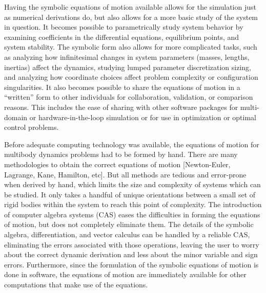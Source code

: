 \documentclass[twocolumn,10pt]{asme2e}
\begin{document}
Having the symbolic equations of motion available allows for the simulation
just as numerical derivations do, but also allows for a more basic study of the
system in question. It becomes possible to parametrically study system behavior
by examining coefficients in the differential equations, equilibrium points,
and system stability. The symbolic form also allows for more complicated tasks,
such as analyzing how infinitesimal changes in system parameters (masses,
lengths, inertias) affect the dynamics, studying lumped parameter
discretization sizing, and analyzing how coordinate choices affect problem
complexity or configuration singularities. It also becomes possible to share
the equations of motion in a “written” form to other individuals for
collaboration, validation, or comparison reasons. This includes the ease of
sharing with other software packages for multi-domain or hardware-in-the-loop
simulation or for use in optimization or optimal control problems.

Before adequate computing technology was available, the equations of motion for
multibody dynamics problems had to be formed by hand. There are many
methodologies to obtain the correct equations of motion [Newton-Euler,
Lagrange, Kane, Hamilton, etc]. But all methods are tedious and error-prone
when derived by hand, which limits the size and complexity of systems which can
be studied. It only takes a handful of unique orientations between a small set
of rigid bodies within the system to reach this point of complexity. The
introduction of computer algebra systems (CAS) eases the difficulties in
forming the equations of motion, but does not completely eliminate them. The
details of the symbolic algebra, differentiation, and vector calculus can be
handled by a reliable CAS, eliminating the errors associated with those
operations, leaving the user to worry about the correct dynamic derivation and
less about the minor variable and sign errors. Furthermore, since the
formulation of the symbolic equations of motion is done in software, the
equations of motion are immediately available for other computations that make
use of the equations.
\end{document}
